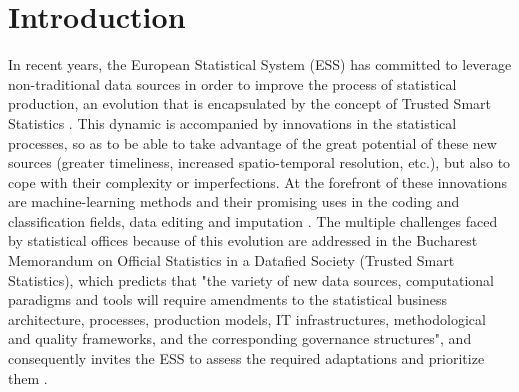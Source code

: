 \documentclass[graybox]{svmult}
\begin{document}




\section{Introduction}
\label{sec:introduction}

In recent years, the European Statistical System (ESS) has committed to leverage non-traditional data sources in order to improve the process of statistical production, an evolution that is encapsulated by the concept of Trusted Smart Statistics \cite{ricciato2019trusted}. This dynamic is accompanied by innovations in the statistical processes, so as to be able to take advantage of the great potential of these new sources (greater timeliness, increased spatio-temporal resolution, etc.), but also to cope with their complexity or imperfections. At the forefront of these innovations are machine-learning methods and their promising uses in the coding and classification fields, data editing and imputation \cite{gjaltema2022high}. The multiple challenges faced by statistical offices because of this evolution are addressed in the Bucharest Memorandum on Official Statistics in a Datafied Society (Trusted Smart Statistics), which predicts that "the variety of new data sources, computational paradigms and tools will require amendments to the statistical business architecture, processes, production models, IT infrastructures, methodological and quality frameworks, and the corresponding governance structures", and consequently invites the ESS to assess the required adaptations and prioritize them \cite{bucharest2018}.
\end{document}
